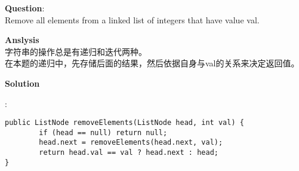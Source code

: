     
\begin{description}
    \item{\textbf{Question}}:\\%
		Remove all elements from a linked list of integers that have value val.

    \item{\textbf{Anslysis}}\\
		字符串的操作总是有递归和迭代两种。\\
		在本题的递归中，先存储后面的结果，然后依据自身与val的关系来决定返回值。

    \item{\textbf{Solution}}
	\item{} : \\
		\begin{lstlisting}
public ListNode removeElements(ListNode head, int val) {
        if (head == null) return null;
        head.next = removeElements(head.next, val);
        return head.val == val ? head.next : head;
}
		\end{lstlisting}
\end{description}

